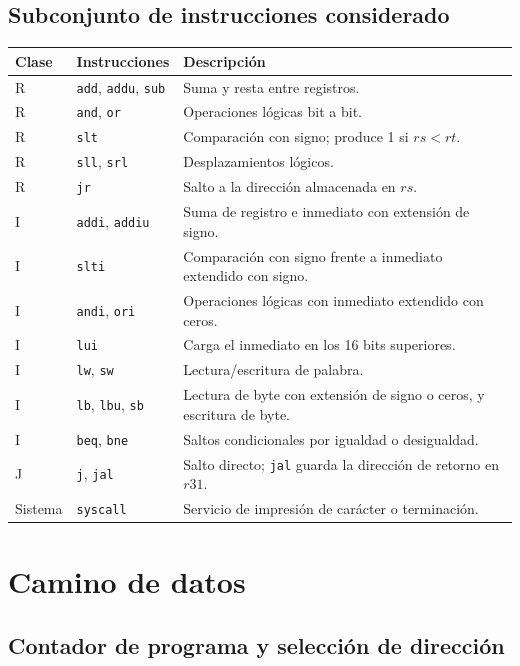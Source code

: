 \documentclass[11pt,a4paper]{article}
\begin{document}
\subsection{Subconjunto de instrucciones considerado}

\begin{longtable}{@{}llp{8.2cm}@{}}
    \toprule
    \textbf{Clase} & \textbf{Instrucciones} & \textbf{Descripción} \\
    \midrule
    R & \texttt{add}, \texttt{addu}, \texttt{sub} & Suma y resta entre registros. \\
    R & \texttt{and}, \texttt{or} & Operaciones lógicas bit a bit. \\
    R & \texttt{slt} & Comparación con signo; produce 1 si $rs<rt$. \\
    R & \texttt{sll}, \texttt{srl} & Desplazamientos lógicos. \\
    R & \texttt{jr} & Salto a la dirección almacenada en $rs$. \\
    I & \texttt{addi}, \texttt{addiu} & Suma de registro e inmediato con extensión de signo. \\
    I & \texttt{slti} & Comparación con signo frente a inmediato extendido con signo. \\
    I & \texttt{andi}, \texttt{ori} & Operaciones lógicas con inmediato extendido con ceros. \\
    I & \texttt{lui} & Carga el inmediato en los 16 bits superiores. \\
    I & \texttt{lw}, \texttt{sw} & Lectura/escritura de palabra. \\
    I & \texttt{lb}, \texttt{lbu}, \texttt{sb} & Lectura de byte con extensión de signo o ceros, y escritura de byte.\\
    I & \texttt{beq}, \texttt{bne} & Saltos condicionales por igualdad o desigualdad. \\
    J & \texttt{j}, \texttt{jal} & Salto directo; \texttt{jal} guarda la dirección de retorno en $r31$. \\
    Sistema & \texttt{syscall} & Servicio de impresión de carácter o terminación. \\
    \bottomrule
\end{longtable}

\section{Camino de datos}

\subsection{Contador de programa y selección de dirección}
\end{document}
